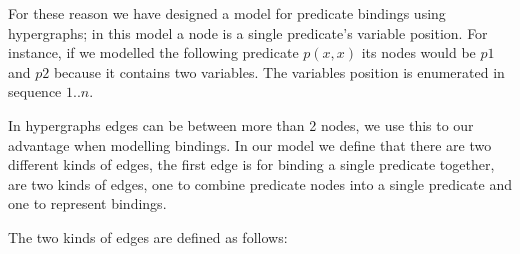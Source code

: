 \documentclass[../Master.tex]{subfiles}
\begin{document}
	For these reason we have designed a model for predicate bindings using hypergraphs; 
	in this	model a node is a single predicate's variable position. 
	For instance, if we modelled the following predicate $p(x,x)$ its nodes would be $p1$ and $p2$ because it contains two variables.
	The variables position is enumerated in sequence $1..n$.	 
	
	In hypergraphs edges can be between more than 2 nodes, we use this to our advantage when modelling bindings. 
	In our model we define that there are two different kinds of edges, the first edge is for binding a single predicate together, 
	are two kinds of edges, one to combine predicate nodes into a single predicate and one to represent bindings.
	
	The two kinds of edges are defined as follows: 
	
\end{document}
